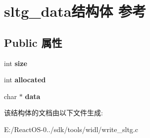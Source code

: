 \hypertarget{structsltg__data}{}\section{sltg\+\_\+data结构体 参考}
\label{structsltg__data}
\subsection*{Public 属性}
\begin{DoxyCompactItemize}
\item 
\mbox{\label{structsltg__data_ab5d47687b67a8249c4c64ae8f12f525b}} 
int {\bfseries size}
\item 
\mbox{\label{structsltg__data_afecb20d0b175886f0d6eacd49d60a440}} 
int {\bfseries allocated}
\item 
\mbox{\label{structsltg__data_a8a634200f534584cbe130d4b9a22f629}} 
char $\ast$ {\bfseries data}
\end{DoxyCompactItemize}


该结构体的文档由以下文件生成\+:\begin{DoxyCompactItemize}
\item 
E\+:/\+React\+O\+S-\/0../sdk/tools/widl/write\+\_\+sltg.\+c\end{DoxyCompactItemize}
